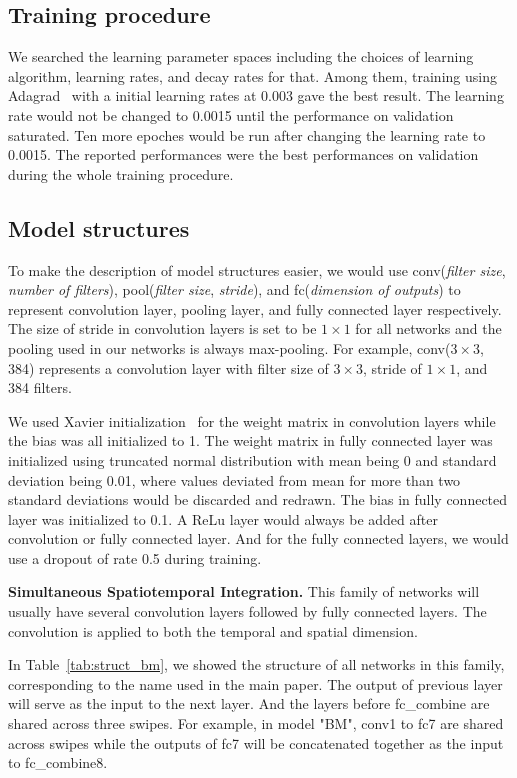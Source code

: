 \subsection{Training procedure}

We searched the learning parameter spaces including the choices of learning algorithm, learning rates, and decay rates for that. 
Among them, training using Adagrad~\cite{duchi2011adaptive} with a initial learning rates at 0.003 gave the best result. 
The learning rate would not be changed to 0.0015 until the performance on validation saturated.
Ten more epoches would be run after changing the learning rate to 0.0015.
The reported performances were the best performances on validation during the whole training procedure.

\subsection{Model structures}

To make the description of model structures easier, we would use conv(\textit{filter size}, \textit{number of filters}), pool(\textit{filter size}, \textit{stride}), and fc(\textit{dimension of outputs}) to represent convolution layer, pooling layer, and fully connected layer respectively.
The size of stride in convolution layers is set to be $1\times1$ for all networks and the pooling used in our networks is always max-pooling.
For example, conv($3\times3$, 384) represents a convolution layer with filter size of $3\times3$, stride of $1\times1$, and 384 filters.

We used Xavier initialization~\cite{glorot2010understanding} for the weight matrix in convolution layers while the bias was all initialized to 1.
The weight matrix in fully connected layer was initialized using truncated normal distribution with mean being 0 and standard deviation being 0.01, where values deviated from mean for more than two standard deviations would be discarded and redrawn.
The bias in fully connected layer was initialized to 0.1.
A ReLu layer would always be added after convolution or fully connected layer.
And for the fully connected layers, we would use a dropout of rate 0.5 during training.~\cite{Krizhevsky} 

\textbf{Simultaneous Spatiotemporal Integration.}
This family of networks will usually have several convolution layers followed by fully connected layers. The convolution is applied to both the temporal and spatial dimension.

In Table~\ref{tab:struct_bm}, we showed the structure of all networks in this family, corresponding to the name used in the main paper.
The output of previous layer will serve as the input to the next layer.
And the layers before fc\_combine are shared across three swipes. For example, in model "BM", conv1 to fc7 are shared across swipes while the outputs of fc7 will be concatenated together as the input to fc\_combine8.

